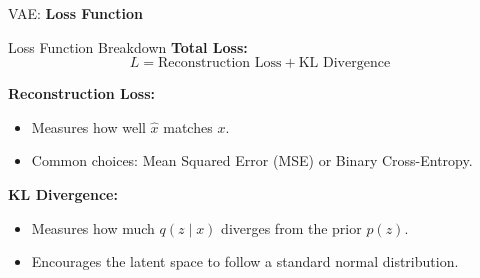 \begin{frame}{}
	\LARGE VAE: \textbf{Loss Function}
\end{frame}

\begin{frame}[allowframebreaks]{Loss Function Breakdown}
\textbf{Total Loss:}
\[
L = \text{Reconstruction Loss} + \text{KL Divergence}
\]

\textbf{Reconstruction Loss:}
\begin{itemize}
    \item Measures how well $\hat{x}$ matches $x$.
    \item Common choices: Mean Squared Error (MSE) or Binary Cross-Entropy.
\end{itemize}

\textbf{KL Divergence:}
\begin{itemize}
    \item Measures how much $q(z \mid x)$ diverges from the prior $p(z)$.
    \item Encourages the latent space to follow a standard normal distribution.
\end{itemize}
\end{frame}